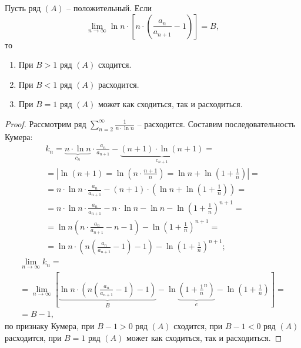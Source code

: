 \newpage

\begin{theorem}
    Пусть ряд $(A)$ -- положительный. Если
    \[
        \underset{n\rightarrow\infty}{\lim} \ln n \cdot \left[n \cdot (\frac{a_n}{a_{n+1}} - 1)\right] = B,
    \]
    то
    \begin{enumerate}
        \item При $B > 1$ ряд $(A)$ сходится.
        \item При $B < 1$ ряд $(A)$ расходится.
        \item При $B = 1$ ряд $(A)$ может как сходиться, так и расходиться.
    \end{enumerate}
\end{theorem}

\begin{proof}
    Рассмотрим ряд $\sum_{n=2}^{\infty} \frac{1}{n\cdot \ln n}$ -- расходится. Составим последовательность Кумера:
    \begin{multline*}
        k_n = \underbrace{n \cdot \ln n}_{c_n} \cdot \frac{a_n}{a_{n+1}} - \underbrace{(n+1) \cdot \ln(n+1)}_{c_{n+1}} = \\
        = \left| \ln(n+1) = \ln\left(n\cdot \frac{n+1}{n}\right) = \ln n + \ln\left(1 + \frac{1}{n}\right) \right| = \\
        = n \cdot \ln n \cdot \frac{a_n}{a_{n+1}} - (n+1)\cdot \left(\ln n + \ln\left(1 + \frac{1}{n}\right)\right) = \\
        = n \cdot \ln n \cdot \frac{a_n}{a_{n+1}} - n\cdot \ln n - \ln n - \ln\left(1 + \frac{1}{n}\right)^{n+1} = \\
        = \ln n \left(n \cdot \frac{a_n}{a_{n+1}} - n - 1\right) - \ln \left(1 + \frac{1}{n}\right)^{n+1} = \\
        = \ln n \cdot \left(n\left(\frac{a_n}{a_{n+1}} - 1\right) - 1\right) - \ln\left(1+\frac{1}{n}\right)^{n+1};
    \end{multline*}
    \begin{multline*}
        \underset{n\rightarrow\infty}{\lim} k_n = \\
        = \underset{n\rightarrow\infty}{\lim}\left[\underbrace{\ln n \cdot \left(n\left(\frac{a_n}{a_{n+1}} - 1\right) - 1\right)}_{B} - \ln\underbrace{\left(1 + \frac{1}{n}^n\right)}_{e} - \ln\left(1 + \frac{1}{n}\right)\right] = \\
        = B - 1,
    \end{multline*}
    по признаку Кумера, при $B-1 > 0$ ряд $(A)$ сходится, при $B-1 < 0$ ряд $(A)$ расходится, при $B=1$ ряд $(A)$ может как сходиться, так и расходиться.
\end{proof}

